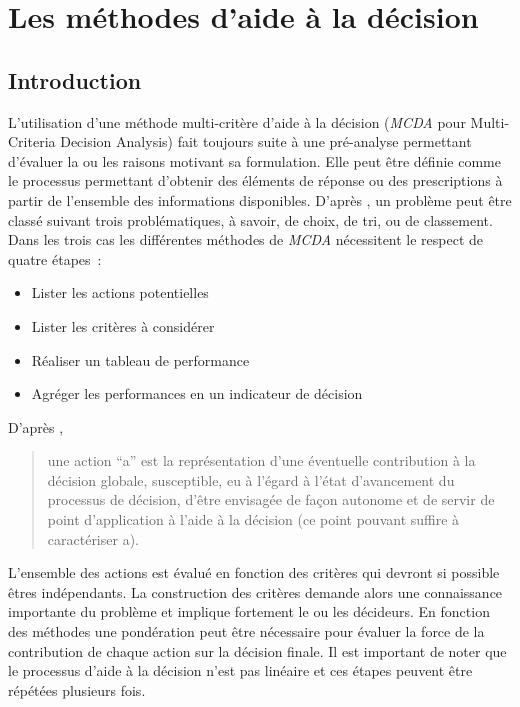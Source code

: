 

\section{Les méthodes d’aide à la décision} %
\label{sec:les_methodes_d_aide_à_la_decision}
\subsection{Introduction} %
\label{sub:mcda_introduction}
L’utilisation d’une méthode multi-critère d’aide à la décision (\textit{MCDA} pour Multi-Criteria
Decision Analysis) fait toujours suite à une pré-analyse permettant d’évaluer la ou les
raisons motivant sa formulation. Elle peut être définie comme le processus permettant
d’obtenir des éléments de réponse ou des prescriptions à partir de l’ensemble des
informations disponibles. D’après \textcite{Roy1996}, un problème peut être
classé suivant trois problématiques, à savoir, de choix, de tri, ou de classement. Dans les
trois cas les différentes méthodes de \textit{MCDA} nécessitent le respect de quatre étapes~:
\begin{itemize}
  \item Lister les actions potentielles
  \item Lister les critères à considérer
  \item Réaliser un tableau de performance
  \item Agréger les performances en un indicateur de décision
\end{itemize}

\noindent D’après \textcite{Roy1985}, \blockquote{une action \enquote{a} est la représentation d’une
éventuelle contribution à la décision globale, susceptible, eu à l’égard à l’état
d’avancement du processus de décision, d’être envisagée de façon autonome et de servir de
point d’application à l’aide à la décision (ce point pouvant suffire à caractériser a).}
L’ensemble des actions est évalué en fonction des critères qui devront si possible êtres
indépendants. La construction des critères demande alors une connaissance importante du
problème et implique fortement le ou les décideurs. En fonction des méthodes une
pondération peut être nécessaire pour évaluer la force de la contribution de chaque action
sur la décision finale. Il est important de noter que le processus d’aide à la décision
n’est pas linéaire et ces étapes peuvent être répétées plusieurs fois.

